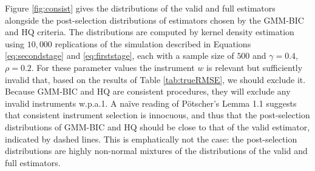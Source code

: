 \documentclass[12pt]{article}
\theoremstyle{definition}
\begin{document}
Figure \ref{fig:consist} gives the distributions of the valid and full estimators alongside the post-selection distributions of estimators chosen by the GMM-BIC and HQ criteria. The distributions are computed by kernel density estimation using $10,000$ replications of the simulation described in Equations \ref{eq:secondstage} and \ref{eq:firststage}, each with a sample size of $500$ and $\gamma = 0.4$, $\rho= 0.2$. For these parameter values the instrument $w$ is relevant but sufficiently invalid that, based on the results of Table \ref{tab:trueRMSE}, we should exclude it. Because GMM-BIC and HQ are consistent procedures, they will exclude any invalid instruments w.p.a.1. A na\"{i}ve reading of P\"{o}tscher's Lemma 1.1 suggests that consistent instrument selection is innocuous, and thus that the post-selection distributions of GMM-BIC and HQ should be close to that of the valid estimator, indicated by dashed lines. This is emphatically not the case: the post-selection distributions are highly non-normal mixtures of the distributions of the valid and full estimators. 
\end{document}
